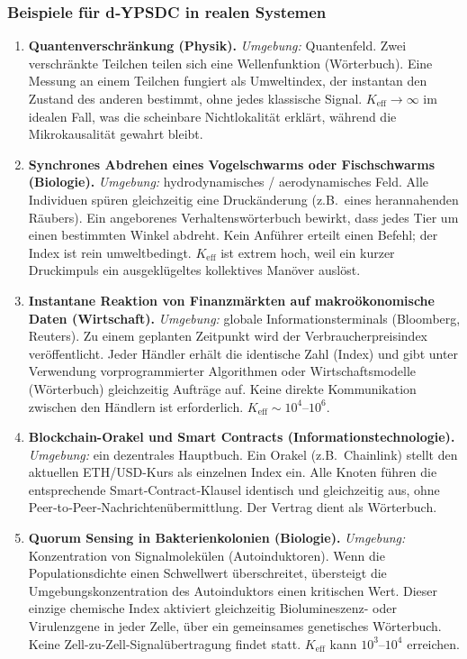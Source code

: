 \documentclass[11pt,a4paper]{article}
\begin{document}
	\subsubsection*{Beispiele für d‑YPSDC in realen Systemen}
	
	\begin{enumerate}[leftmargin=*]
		\item \textbf{Quantenverschränkung (Physik).}
		\textit{Umgebung:} Quantenfeld. Zwei verschränkte Teilchen teilen sich eine Wellenfunktion (Wörterbuch).
		Eine Messung an einem Teilchen fungiert als Umweltindex, der instantan den Zustand des anderen bestimmt, ohne jedes klassische Signal. $K_{\mathrm{eff}}\to\infty$ im idealen Fall,
		was die scheinbare Nichtlokalität erklärt, während die Mikrokausalität gewahrt bleibt.
		
		\item \textbf{Synchrones Abdrehen eines Vogelschwarms oder Fischschwarms (Biologie).}
		\textit{Umgebung:} hydrodynamisches / aerodynamisches Feld. Alle Individuen spüren gleichzeitig eine Druckänderung (z.B.\ eines herannahenden Räubers). Ein angeborenes Verhaltenswörterbuch bewirkt, dass jedes Tier um einen bestimmten Winkel abdreht. Kein Anführer erteilt einen Befehl; der Index ist rein umweltbedingt.
		$K_{\mathrm{eff}}$ ist extrem hoch, weil ein kurzer Druckimpuls ein ausgeklügeltes kollektives Manöver auslöst.
		
		\item \textbf{Instantane Reaktion von Finanzmärkten auf makroökonomische Daten (Wirtschaft).}
		\textit{Umgebung:} globale Informationsterminals (Bloomberg, Reuters). Zu einem geplanten Zeitpunkt wird der Verbraucherpreisindex veröffentlicht. Jeder Händler erhält die identische Zahl (Index) und gibt unter Verwendung vorprogrammierter Algorithmen oder Wirtschaftsmodelle (Wörterbuch) gleichzeitig Aufträge auf. Keine direkte Kommunikation zwischen den Händlern ist erforderlich. $K_{\mathrm{eff}}\sim 10^{4}$--$10^{6}$.
		
		\item \textbf{Blockchain-Orakel und Smart Contracts (Informationstechnologie).}
		\textit{Umgebung:} ein dezentrales Hauptbuch. Ein Orakel (z.B.\ Chainlink) stellt den aktuellen ETH/USD-Kurs als einzelnen Index ein. Alle Knoten führen die entsprechende Smart‑Contract‑Klausel identisch und gleichzeitig aus, ohne Peer‑to‑Peer‑Nachrichtenübermittlung. Der Vertrag dient als Wörterbuch.
		
		\item \textbf{Quorum Sensing in Bakterienkolonien (Biologie).}
		\textit{Umgebung:} Konzentration von Signalmolekülen (Autoinduktoren). Wenn die Populationsdichte einen Schwellwert überschreitet, übersteigt die Umgebungskonzentration des Autoinduktors einen kritischen Wert. Dieser einzige chemische Index aktiviert gleichzeitig Biolumineszenz- oder Virulenzgene in jeder Zelle, über ein gemeinsames genetisches Wörterbuch. Keine Zell-zu-Zell-Signalübertragung findet statt.
		$K_{\mathrm{eff}}$ kann $10^{3}$--$10^{4}$ erreichen.
	\end{enumerate}
	
\end{document}
